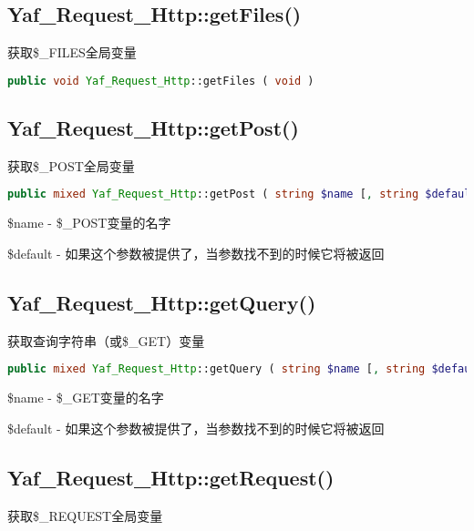 \subsection{Yaf\_Request\_Http::getFiles()}

获取\$\_FILES全局变量

\begin{lstlisting}[language=PHP]
public void Yaf_Request_Http::getFiles ( void )
\end{lstlisting}

\subsection{Yaf\_Request\_Http::getPost()}

获取\$\_POST全局变量
\begin{lstlisting}[language=PHP]
public mixed Yaf_Request_Http::getPost ( string $name [, string $default ] )
\end{lstlisting}

\begin{compactitem}
\item \$name - \$\_POST变量的名字
\item \$default - 如果这个参数被提供了，当参数找不到的时候它将被返回
\end{compactitem}

\subsection{Yaf\_Request\_Http::getQuery()}

获取查询字符串（或\$\_GET）变量

\begin{lstlisting}[language=PHP]
public mixed Yaf_Request_Http::getQuery ( string $name [, string $default ] )
\end{lstlisting}

\begin{compactitem}
\item \$name - \$\_GET变量的名字
\item \$default - 如果这个参数被提供了，当参数找不到的时候它将被返回
\end{compactitem}


\subsection{Yaf\_Request\_Http::getRequest()}

获取\$\_REQUEST全局变量

